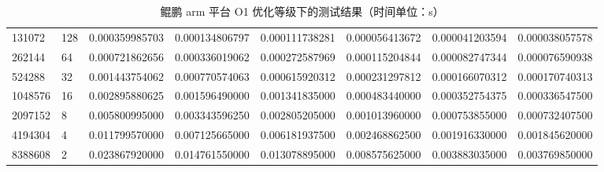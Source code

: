 \documentclass[a4paper]{article}
\begin{document}
\begin{table}[]
{\begin{tabular}{llllllll}
      131072  & 128     & 0.000359985703 & 0.000134806797 & 0.000111738281  & 0.000056413672 & 0.000041203594 & 0.000038057578 \\
      262144  & 64      & 0.000721862656 & 0.000336019062 & 0.000272587969  & 0.000115204844 & 0.000082747344 & 0.000076590938 \\
      524288  & 32      & 0.001443754062 & 0.000770574063 & 0.000615920312  & 0.000231297812 & 0.000166070312 & 0.000170740313 \\
      1048576 & 16      & 0.002895880625 & 0.001596490000 & 0.001341835000  & 0.000483440000 & 0.000352754375 & 0.000336547500 \\
      2097152 & 8       & 0.005800995000 & 0.003343596250 & 0.002805205000  & 0.001013960000 & 0.000753855000 & 0.000732407500 \\
      4194304 & 4       & 0.011799570000 & 0.007125665000 & 0.006181937500  & 0.002468862500 & 0.001916330000 & 0.001845620000 \\
      8388608 & 2       & 0.023867920000 & 0.014761550000 & 0.013078895000  & 0.008575625000 & 0.003883035000 & 0.003769850000
    \end{tabular}%
  }
  \caption{鲲鹏 arm 平台 O1 优化等级下的测试结果（时间单位：s）}
  \label{tab:arm-O1-test}
\end{table}
\end{document}
